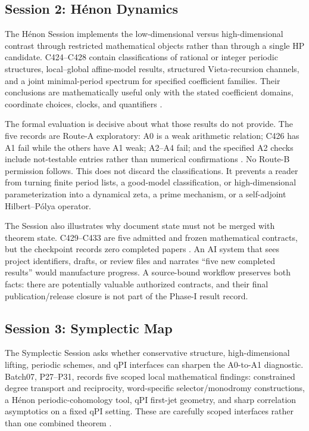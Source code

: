 \hypertarget{session-2-huxe9non-dynamics}{%
\subsection{Session 2: Hénon Dynamics}\label{session-2-huxe9non-dynamics}}

The Hénon Session implements the low-dimensional versus high-dimensional contrast through restricted mathematical objects rather than through a single HP candidate. C424--C428 contain classifications of rational or integer periodic structures, local--global affine-model results, structured Vieta-recursion channels, and a joint minimal-period spectrum for specified coefficient families. Their conclusions are mathematically useful only with the stated coefficient domains, coordinate choices, clocks, and quantifiers .

The formal evaluation is decisive about what those results do not provide. The five records are Route-A exploratory: A0 is a weak arithmetic relation; C426 has A1 fail while the others have A1 weak; A2--A4 fail; and the specified A2 checks include not-testable entries rather than numerical confirmations . No Route-B permission follows. This does not discard the classifications. It prevents a reader from turning finite period lists, a good-model classification, or high-dimensional parameterization into a dynamical zeta, a prime mechanism, or a self-adjoint Hilbert--Pólya operator.

The Session also illustrates why document state must not be merged with theorem state. C429--C433 are five admitted and frozen mathematical contracts, but the checkpoint records zero completed papers . An AI system that sees project identifiers, drafts, or review files and narrates ``five new completed results'' would manufacture progress. A source-bound workflow preserves both facts: there are potentially valuable authorized contracts, and their final publication/release closure is not part of the Phase-I result record.

\hypertarget{session-3-symplectic-map}{%
\subsection{Session 3: Symplectic Map}\label{session-3-symplectic-map}}

The Symplectic Session asks whether conservative structure, high-dimensional lifting, periodic schemes, and qPI interfaces can sharpen the A0-to-A1 diagnostic. Batch07, P27--P31, records five scoped local mathematical findings: constrained degree transport and reciprocity, word-specific selector/monodromy constructions, a Hénon periodic-cohomology tool, qPI first-jet geometry, and sharp correlation asymptotics on a fixed qPI setting. These are carefully scoped interfaces rather than one combined theorem .


